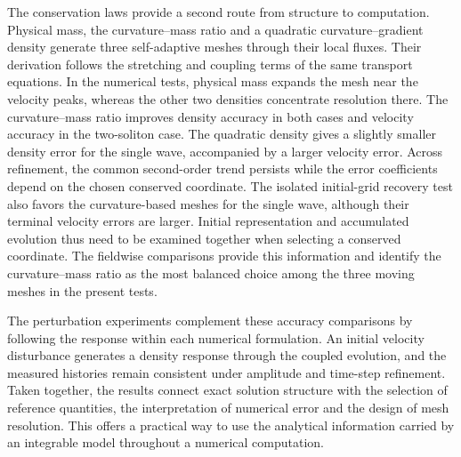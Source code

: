\documentclass[11pt,a4paper]{article}
\begin{document}
The conservation laws provide a second route from structure to computation. Physical mass, the curvature--mass ratio and a quadratic curvature--gradient density generate three self-adaptive meshes through their local fluxes. Their derivation follows the stretching and coupling terms of the same transport equations. In the numerical tests, physical mass expands the mesh near the velocity peaks, whereas the other two densities concentrate resolution there. The curvature--mass ratio improves density accuracy in both cases and velocity accuracy in the two-soliton case. The quadratic density gives a slightly smaller density error for the single wave, accompanied by a larger velocity error. Across refinement, the common second-order trend persists while the error coefficients depend on the chosen conserved coordinate. The isolated initial-grid recovery test also favors the curvature-based meshes for the single wave, although their terminal velocity errors are larger. Initial representation and accumulated evolution thus need to be examined together when selecting a conserved coordinate. The fieldwise comparisons provide this information and identify the curvature--mass ratio as the most balanced choice among the three moving meshes in the present tests.

The perturbation experiments complement these accuracy comparisons by following the response within each numerical formulation. An initial velocity disturbance generates a density response through the coupled evolution, and the measured histories remain consistent under amplitude and time-step refinement. Taken together, the results connect exact solution structure with the selection of reference quantities, the interpretation of numerical error and the design of mesh resolution. This offers a practical way to use the analytical information carried by an integrable model throughout a numerical computation.
\end{document}
